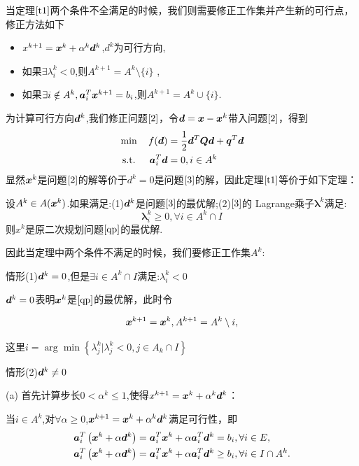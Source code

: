 \documentclass[12pt,oneside,a4paper]{article}
\begin{document}
当定理$\ref{t1}$两个条件不全满足的时候，我们则需要修正工作集并产生新的可行点，修正方法如下
\begin{itemize}
\item $x^{k+1} = {\boldsymbol x}^k+\alpha^k {\boldsymbol d}^k$,$d^k$为可行方向,
\item 如果$\exists \lambda_i^k < 0$,则$A^{k+1} = A^k \setminus \{i\}$ ,
\item 如果$\exists i  \notin A^k, {\boldsymbol a}_i^T {\boldsymbol x}^{k+1} = b_i$,则$A^{k+1} = A^k \cup \{i\}$.
\end{itemize}

为计算可行方向${\boldsymbol d}^k$,我们修正问题$\ref{2}$，令${\boldsymbol d} = {\boldsymbol x} - {\boldsymbol x}^k$带入问题$\ref{2}$，得到
\begin{align}\label{3}
&\min \quad f({\boldsymbol d})=\frac{1}{2} {\boldsymbol d}^{T} {\boldsymbol Q} {\boldsymbol d}+{\boldsymbol q}^{T} {\boldsymbol d}\\
&\text { s.t. } \quad {\boldsymbol a}_{i}^{T} {\boldsymbol d}=0, i \in A^k
\end{align}
显然${\boldsymbol x}^k$是问题$\ref{2}$的解等价于$d^k = 0$是问题$\ref{3}$的解，因此定理$\ref{t1}$等价于如下定理：

\begin{theorem}
设$A^k \in A({\boldsymbol x}^k)$.如果满足:(1)${\boldsymbol d}^k$是问题$\ref{3}$的最优解;(2)$\ref{3}$的
Lagrange乘子$\boldsymbol{\lambda}^k$满足:$$\boldsymbol{\lambda}_i^k \geq 0 ,\forall i \in A^k \cap I$$
则$x^k$是原二次规划问题$\ref{qp}$的最优解.
\end{theorem}

因此当定理中两个条件不满足的时候，我们要修正工作集$A^k$:

\noindent 情形(1)${\boldsymbol d}^k = 0$,但是$\exists i \in A^k \cap I$满足:$\lambda^k_i < 0$

${\boldsymbol d}^k = 0$表明${\boldsymbol x}^k$是$\ref{qp}$的最优解，此时令

\begin{equation*}
{\boldsymbol x}^{k+1}={\boldsymbol x}^{k}, A^{k+1}=A^{k} \setminus i,
\end{equation*}

这里$i = \arg \min \left\{\lambda_{j}^{k} | \lambda_{j}^{k}<0, j \in A_k \cap I\right\}$

\noindent 情形(2)${\boldsymbol d}^k \neq 0$

(a)
首先计算步长$0<\alpha^k\leq1$,使得$x^{k+1} = {\boldsymbol x}^k+\alpha^k {\boldsymbol d}^k$：

当$i \in A^k$,对$\forall \alpha \geqslant 0$,${\boldsymbol x}^{k+1}={\boldsymbol x}^k+\alpha^k {\boldsymbol d}^k$满足可行性，即
\begin{align*}
{\boldsymbol a}_{i}^{T}\left({\boldsymbol x}^{k}+\alpha {\boldsymbol d}^{k}\right) 
&={\boldsymbol a}_{i}^{T} {\boldsymbol x}^{k}+\alpha {\boldsymbol a}_{i}^{T} {\boldsymbol d}^{k}=b_{i}, \forall i \in E, \\
{\boldsymbol a}_{i}^{T}\left({\boldsymbol x}^{k}+\alpha {\boldsymbol d}^{k}\right) 
&={\boldsymbol a}_{i}^{T} {\boldsymbol x}^{k}+\alpha {\boldsymbol a}_{i}^{T} {\boldsymbol d}^{k} \geq b_{i}, \forall i \in I \cap A^{k}.
\end{align*}
\end{document}
